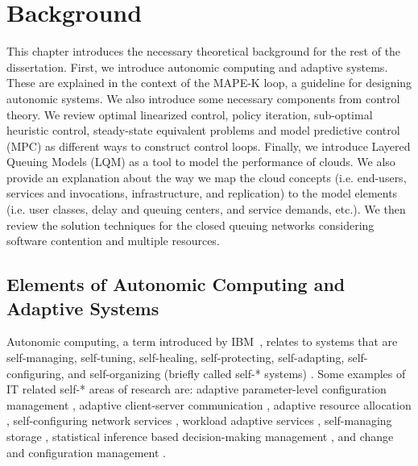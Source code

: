    
 \chapter{Background}    
 \label{ch:background}  
  This chapter introduces the necessary theoretical background for the rest of the dissertation. First, we introduce autonomic computing and adaptive systems. These are explained in the context of  the MAPE-K loop, a guideline for designing autonomic systems.  
  We also introduce some necessary components from control theory. We review optimal linearized control, policy iteration, sub-optimal heuristic control, steady-state equivalent problems and model predictive control (MPC) as different ways to construct control loops. Finally, we introduce Layered Queuing Models (LQM) as a tool to model the performance of clouds. We also provide an explanation about the way we map the cloud concepts (i.e. end-users,
  services and  invocations, infrastructure, and replication)  to the model elements (i.e. user classes, delay and queuing centers, and service demands, etc.).  We then review the solution techniques for the closed queuing networks considering software contention and multiple resources. 
   
 \section{Elements of Autonomic Computing and Adaptive Systems}
  Autonomic computing, a term introduced by IBM~\cite{computing2005architectural}, relates to systems that are self-managing, self-tuning, self-healing, self-protecting, self-adapting, self-configuring, and self-organizing (briefly called self-* systems) \cite{babaoglu2005grassroots}. 
Some examples of IT related self-* areas of research are:
adaptive parameter-level configuration management \cite{ensink2004coordinating, chang2000automatic, cangussu2004control},  
adaptive client-server communication \cite{loyall1998specifying, noble1997agile, balan2003tactics},  
adaptive resource allocation \cite{doyle_model-based_2003,lee1999scalable}, 
self-configuring network services \cite{huang2004building}, 
workload adaptive services \cite{menasce-accessing-ICAC-2004}, 
self-managing storage \cite{mesnier2004file}, 
statistical inference based decision-making management \cite{cohen2004correlating}, and change and configuration management \cite{wang2003strider}.  

